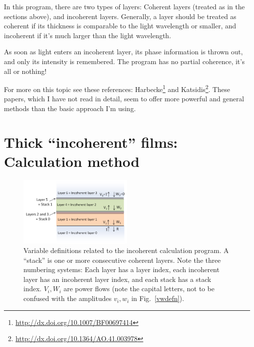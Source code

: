 \documentclass[12pt]{article}
\renewcommand{\(}{\left(}
\renewcommand{\)}{\right)}
\begin{document}
In this program, there are two types of layers: Coherent layers (treated as in the sections above), and incoherent layers. Generally, a layer should be treated as coherent if its thickness is comparable to the light wavelength or smaller, and incoherent if it's much larger than the light wavelength.

As soon as light enters an incoherent layer, its phase information is thrown out, and only its intensity is remembered. The program has no partial coherence, it's all or nothing!

For more on this topic see these references: Harbecke\footnote{\url{http://dx.doi.org/10.1007/BF00697414}} and Katsidis\footnote{\url{http://dx.doi.org/10.1364/AO.41.003978}}. These papers, which I have not read in detail, seem to offer more powerful and general methods than the basic approach I'm using.

\section{Thick ``incoherent'' films: Calculation method}

\begin{figure}[htb]
\centering
\includegraphics[width=0.5\textwidth]{incoherentfig.png}
\caption{Variable definitions related to the incoherent calculation program. A ``stack'' is one or more consecutive coherent layers. Note the three numbering systems: Each layer has a layer index, each incoherent layer has an incoherent layer index, and each stack has a stack index. $V_i,W_i$ are power flows (note the capital letters, not to be confused with the amplitudes $v_i,w_i$ in Fig.~\ref{vwdefn}).\label{incoherentfig}}
\end{figure}
\end{document}
